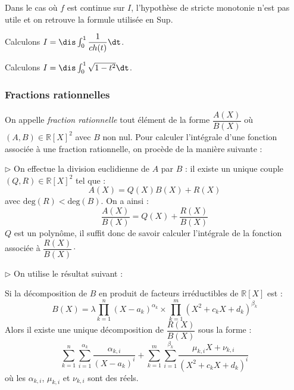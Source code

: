 \documentclass[a4paper,10pt]{report}
\begin{document}
\newpage

\begin{rem} Dans le cas où $f$ est continue sur $I$, l'hypothèse de stricte monotonie n'est pas utile et on retrouve la formule utilisée en Sup.
\end{rem}

\begin{ex} Calculons $I= \dis \int_{0}^1 \dfrac{1}{ch(t)} \dt$.

\vspace{7cm}
\end{ex}

\begin{ex} Calculons $I= \dis \int_{0}^1 \sqrt{1-t^2} \dt$.

\vspace{7cm}
\end{ex}


\subsubsection{Fractions rationnelles}

\noindent On appelle \textit{fraction rationnelle} tout élément de la forme $\dfrac{A(X)}{B(X)}$ où $(A,B) \in \mathbb{R}[X]^2$ avec $B$ non nul. Pour calculer l'intégrale d'une fonction associée à une fraction rationnelle, on procède de la manière suivante : 

\bigskip

\noindent $\rhd$ On effectue la division euclidienne de $A$ par $B$ : il existe un unique couple $(Q,R) \in \mathbb{R}[X]^2$ tel que :
$$ A(X) = Q(X)B(X) + R(X)$$
avec $\textrm{deg}(R)< \textrm{deg}(B)$. On a ainsi :
$$ \dfrac{A(X)}{B(X)} = Q(X) + \dfrac{R(X)}{B(X)}$$
$Q$ est un polynôme, il suffit donc de savoir calculer l'intégrale de la fonction associée à $\dfrac{R(X)}{B(X)} \cdot$

\medskip

\noindent $\rhd$ On utilise le résultat suivant :

\begin{thm} Si la décomposition de $B$ en produit de facteurs irréductibles de $\mathbb{R}[X]$ est :
$$ B(X) = \lambda \prod_{k=1}^n (X-a_k)^{\alpha_k} \times \prod_{k=1}^m (X^2+ c_k X + d_k)^{\beta_k} $$
Alors il existe une unique décomposition de $\dfrac{R(X)}{B(X)}$ sous la forme :
$$ \sum_{k=1}^n \sum_{i=1}^{\alpha_k} \frac{\alpha_{k,i}}{(X-a_k)^{i}} + \sum_{k=1}^m \sum_{i=1}^{\beta_k} \dfrac{\mu_{k,i} X + \nu_{k,i}}{(X^2+ c_k X + d_k)^i} $$
où les $\alpha_{k,i}$, $\mu_{k,i}$ et $\nu_{k,i}$ sont des réels.
\end{thm}
\end{document}
